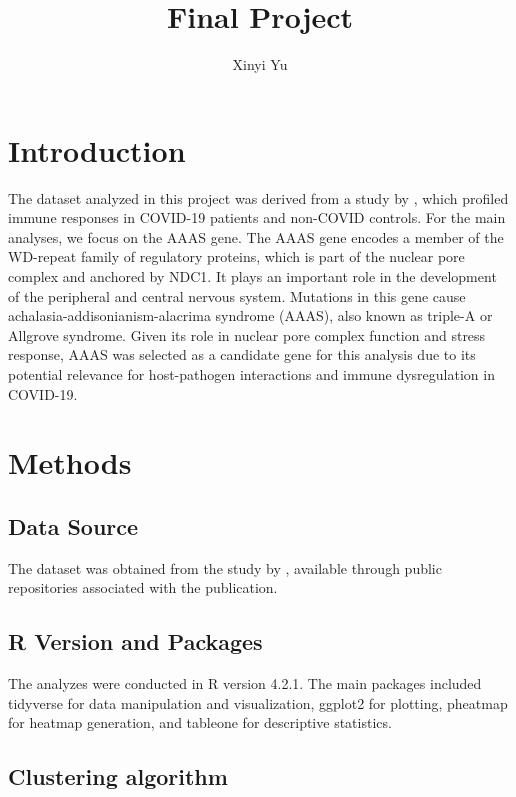 \documentclass{article}
\title{Final Project}
\author{Xinyi Yu}
\begin{document}
\maketitle

\section{Introduction}

The dataset analyzed in this project was derived from a study by \cite{overmyer_large-scale_2021}, which profiled immune responses in COVID-19 patients and non-COVID controls. For the main analyses, we focus on the AAAS gene. The AAAS gene encodes a member of the WD-repeat family of regulatory proteins, which is part of the nuclear pore complex and anchored by NDC1. It plays an important role in the development of the peripheral and central nervous system. Mutations in this gene cause achalasia-addisonianism-alacrima syndrome (AAAS), also known as triple-A or Allgrove syndrome.\cite{noauthor_aaas_nodate} Given its role in nuclear pore complex function and stress response, AAAS was selected as a candidate gene for this analysis due to its potential relevance for host-pathogen interactions and immune dysregulation in COVID-19.


\section{Methods}

\subsection{Data Source}

The dataset was obtained from the study by \cite{overmyer_large-scale_2021}, available through public repositories associated with the publication.

\subsection{R Version and Packages}

The analyzes were conducted in R version 4.2.1. The main packages included tidyverse for data manipulation and visualization, ggplot2 for plotting, pheatmap for heatmap generation, and tableone for descriptive statistics.

\subsection{Clustering algorithm}
\end{document}
